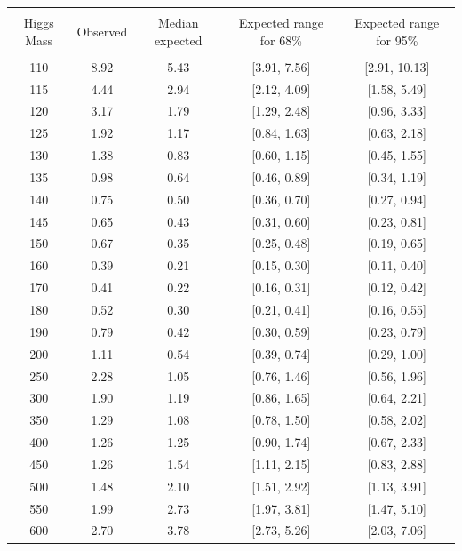 \begin{table}[hbp!]
\begin{center}
\begin{tabular}{c c c c c}
\hline
\vspace{-3mm} && \\
 Higgs Mass & Observed  & Median expected & Expected range for 68\% & Expected range for 95\%   \\
\vspace{-3mm} && \\
\hline
110 & 8.92 & 5.43 & [3.91, 7.56] & [2.91, 10.13] \\
115 & 4.44 & 2.94 & [2.12, 4.09] & [1.58, 5.49] \\
120 & 3.17 & 1.79 & [1.29, 2.48] & [0.96, 3.33] \\
125 & 1.92 & 1.17 & [0.84, 1.63] & [0.63, 2.18] \\
130 & 1.38 & 0.83 & [0.60, 1.15] & [0.45, 1.55] \\
135 & 0.98 & 0.64 & [0.46, 0.89] & [0.34, 1.19] \\
140 & 0.75 & 0.50 & [0.36, 0.70] & [0.27, 0.94] \\
145 & 0.65 & 0.43 & [0.31, 0.60] & [0.23, 0.81] \\
150 & 0.67 & 0.35 & [0.25, 0.48] & [0.19, 0.65] \\
160 & 0.39 & 0.21 & [0.15, 0.30] & [0.11, 0.40] \\
170 & 0.41 & 0.22 & [0.16, 0.31] & [0.12, 0.42] \\
180 & 0.52 & 0.30 & [0.21, 0.41] & [0.16, 0.55] \\
190 & 0.79 & 0.42 & [0.30, 0.59] & [0.23, 0.79] \\
200 & 1.11 & 0.54 & [0.39, 0.74] & [0.29, 1.00] \\
250 & 2.28 & 1.05 & [0.76, 1.46] & [0.56, 1.96] \\
300 & 1.90 & 1.19 & [0.86, 1.65] & [0.64, 2.21] \\
350 & 1.29 & 1.08 & [0.78, 1.50] & [0.58, 2.02] \\
400 & 1.26 & 1.25 & [0.90, 1.74] & [0.67, 2.33] \\
450 & 1.26 & 1.54 & [1.11, 2.15] & [0.83, 2.88] \\
500 & 1.48 & 2.10 & [1.51, 2.92] & [1.13, 3.91] \\
550 & 1.99 & 2.73 & [1.97, 3.81] & [1.47, 5.10] \\
600 & 2.70 & 3.78 & [2.73, 5.26] & [2.03, 7.06] \\
\hline
\end{tabular}

\end{center}
\end{table}
